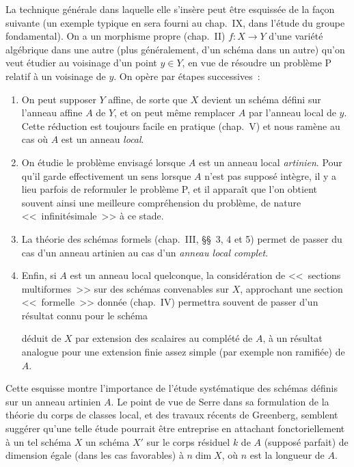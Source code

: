 La technique générale dans laquelle elle s'insère peut être esquissée de la façon suivante (un exemple typique en sera fourni au chap.~IX, dans l'étude du groupe fondamental).
On a un morphisme propre (chap.~II) $f:X\to Y$ d'une variété algébrique dans une autre (plus généralement, d'un schéma dans un autre) qu'on veut étudier au voisinage d'un point $y\in Y$, en vue de résoudre un problème P relatif à un voisinage de $y$.
On opère par étapes successives~:
\begin{enumerate}
  \item[1\textsuperscript{o}] On peut supposer $Y$ affine, de sorte que $X$ devient un schéma défini sur l'anneau affine $A$ de $Y$, et on peut même remplacer $A$ par l'anneau local de $y$.
  Cette réduction est toujours facile en pratique (chap.~V) et nous ramène au cas où $A$ est un anneau \emph{local}.
  \item[2\textsuperscript{o}] On étudie le problème envisagé lorsque $A$ est un anneau local \emph{artinien}.
  Pour qu'il garde effectivement un sens lorsque $A$ n'est pas supposé intègre, il y a lieu parfois de reformuler le problème P, et il apparaît que l'on obtient souvent ainsi une meilleure compréhension du problème, de nature <<~infinitésimale~>> à ce stade.
  \item[3\textsuperscript{o}] La théorie des schémas formels (chap.~III, \S\S~3, 4 et 5) permet de passer du cas d'un anneau artinien au cas d'un \emph{anneau local complet}.
  \item[4\textsuperscript{o}] Enfin, si $A$ est un anneau local quelconque, la considération de <<~sections multiformes~>> sur des schémas convenables sur $X$, approchant une section <<~formelle~>> donnée (chap.~IV) permettra souvent de passer d'un résultat connu pour le schéma

  déduit de $X$ par extension des scalaires au complété de $A$, à un résultat analogue pour une extension finie assez simple (par exemple non ramifiée) de $A$.
\end{enumerate}

Cette esquisse montre l'importance de l'étude systématique des schémas définis sur un anneau artinien $A$.
Le point de vue de Serre dans sa formulation de la théorie du corps de classes local, et des travaux récents de Greenberg, semblent suggérer qu'une telle étude pourrait être entreprise en attachant fonctoriellement à un tel schéma $X$ un schéma $X'$ sur le corps résiduel $k$ de $A$ (supposé parfait) de dimension égale (dans les cas favorables) à $n\dim X$, où $n$ est la longueur de $A$.

